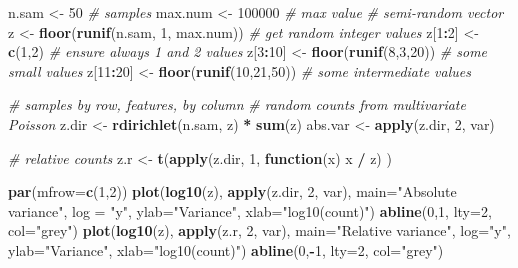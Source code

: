 \documentclass[onecolumn]{book}
\newenvironment{Shaded}{\begin{snugshade}}{\end{snugshade}}
\newcommand{\CommentTok}[1]{\textcolor[rgb]{0.56,0.35,0.01}{\textit{#1}}}
\newcommand{\ControlFlowTok}[1]{\textcolor[rgb]{0.13,0.29,0.53}{\textbf{#1}}}
\newcommand{\DataTypeTok}[1]{\textcolor[rgb]{0.13,0.29,0.53}{#1}}
\newcommand{\DecValTok}[1]{\textcolor[rgb]{0.00,0.00,0.81}{#1}}
\newcommand{\KeywordTok}[1]{\textcolor[rgb]{0.13,0.29,0.53}{\textbf{#1}}}
\newcommand{\NormalTok}[1]{#1}
\newcommand{\OperatorTok}[1]{\textcolor[rgb]{0.81,0.36,0.00}{\textbf{#1}}}
\newcommand{\StringTok}[1]{\textcolor[rgb]{0.31,0.60,0.02}{#1}}
\theoremstyle{definition}
\theoremstyle{definition}
\theoremstyle{definition}
\theoremstyle{remark}
\begin{document}
\begin{Shaded}
\begin{Highlighting}[]
\NormalTok{n.sam <-}\StringTok{ }\DecValTok{50} \CommentTok{# samples}
\NormalTok{max.num <-}\StringTok{ }\DecValTok{100000} \CommentTok{# max value}
\CommentTok{# semi-random vector}
\NormalTok{z <-}\StringTok{ }\KeywordTok{floor}\NormalTok{(}\KeywordTok{runif}\NormalTok{(n.sam, }\DecValTok{1}\NormalTok{, max.num)) }\CommentTok{# get random integer values}
\NormalTok{z[}\DecValTok{1}\OperatorTok{:}\DecValTok{2}\NormalTok{] <-}\StringTok{ }\KeywordTok{c}\NormalTok{(}\DecValTok{1}\NormalTok{,}\DecValTok{2}\NormalTok{) }\CommentTok{# ensure always 1 and 2 values}
\NormalTok{z[}\DecValTok{3}\OperatorTok{:}\DecValTok{10}\NormalTok{] <-}\StringTok{ }\KeywordTok{floor}\NormalTok{(}\KeywordTok{runif}\NormalTok{(}\DecValTok{8}\NormalTok{,}\DecValTok{3}\NormalTok{,}\DecValTok{20}\NormalTok{)) }\CommentTok{# some small values}
\NormalTok{z[}\DecValTok{11}\OperatorTok{:}\DecValTok{20}\NormalTok{] <-}\StringTok{ }\KeywordTok{floor}\NormalTok{(}\KeywordTok{runif}\NormalTok{(}\DecValTok{10}\NormalTok{,}\DecValTok{21}\NormalTok{,}\DecValTok{50}\NormalTok{)) }\CommentTok{# some intermediate values}

\CommentTok{# samples by row, features, by column}
\CommentTok{# random counts from multivariate Poisson}
\NormalTok{z.dir <-}\StringTok{ }\KeywordTok{rdirichlet}\NormalTok{(n.sam, z) }\OperatorTok{*}\StringTok{ }\KeywordTok{sum}\NormalTok{(z)}
\NormalTok{abs.var <-}\StringTok{ }\KeywordTok{apply}\NormalTok{(z.dir, }\DecValTok{2}\NormalTok{, var)}

\CommentTok{# relative counts}
\NormalTok{z.r <-}\StringTok{ }\KeywordTok{t}\NormalTok{(}\KeywordTok{apply}\NormalTok{(z.dir, }\DecValTok{1}\NormalTok{, }\ControlFlowTok{function}\NormalTok{(x) x }\OperatorTok{/}\StringTok{ }\NormalTok{z) )}

\KeywordTok{par}\NormalTok{(}\DataTypeTok{mfrow=}\KeywordTok{c}\NormalTok{(}\DecValTok{1}\NormalTok{,}\DecValTok{2}\NormalTok{))}
\KeywordTok{plot}\NormalTok{(}\KeywordTok{log10}\NormalTok{(z), }\KeywordTok{apply}\NormalTok{(z.dir, }\DecValTok{2}\NormalTok{, var), }\DataTypeTok{main=}\StringTok{"Absolute variance"}\NormalTok{, }\DataTypeTok{log =} \StringTok{"y"}\NormalTok{,}
    \DataTypeTok{ylab=}\StringTok{"Variance"}\NormalTok{, }\DataTypeTok{xlab=}\StringTok{"log10(count)"}\NormalTok{)}
\KeywordTok{abline}\NormalTok{(}\DecValTok{0}\NormalTok{,}\DecValTok{1}\NormalTok{, }\DataTypeTok{lty=}\DecValTok{2}\NormalTok{, }\DataTypeTok{col=}\StringTok{"grey"}\NormalTok{)}
\KeywordTok{plot}\NormalTok{(}\KeywordTok{log10}\NormalTok{(z), }\KeywordTok{apply}\NormalTok{(z.r, }\DecValTok{2}\NormalTok{, var), }\DataTypeTok{main=}\StringTok{"Relative variance"}\NormalTok{, }\DataTypeTok{log=}\StringTok{"y"}\NormalTok{,}
    \DataTypeTok{ylab=}\StringTok{"Variance"}\NormalTok{, }\DataTypeTok{xlab=}\StringTok{"log10(count)"}\NormalTok{)}
\KeywordTok{abline}\NormalTok{(}\DecValTok{0}\NormalTok{,}\OperatorTok{-}\DecValTok{1}\NormalTok{, }\DataTypeTok{lty=}\DecValTok{2}\NormalTok{, }\DataTypeTok{col=}\StringTok{"grey"}\NormalTok{)}
\end{Highlighting}
\end{Shaded}
\end{document}
